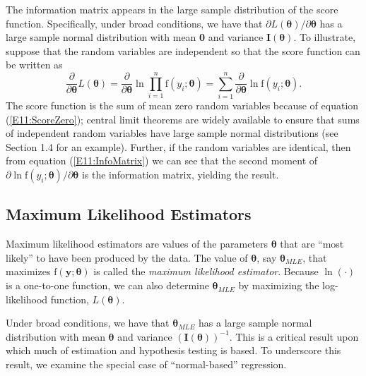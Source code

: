 The information matrix appears in the large sample distribution of
the score function. Specifically, under broad conditions, we have
that $\partial L(\boldsymbol \theta)/\partial \boldsymbol \theta$
has a large sample normal distribution with mean \textbf{0} and
variance $\mathbf{I}(\boldsymbol \theta)$. To illustrate, suppose
that the random variables are independent so that the score function
can be written as
\begin{equation*}
\frac{ \partial}{\partial \boldsymbol \theta} L(\boldsymbol \theta)
=\frac{ \partial}{\partial \boldsymbol \theta} \ln \prod_{i=1}^n
\mathrm{f}(y_i;\boldsymbol \theta ) =\sum_{i=1}^n \frac{
\partial}{\partial \boldsymbol \theta}
\ln \mathrm{f}(y_i;\boldsymbol \theta ).
\end{equation*}
The score function is the sum of mean zero random variables because
of equation (\ref{E11:ScoreZero}); central limit theorems are widely
available to ensure that sums of independent random variables have
large sample normal distributions (see Section 1.4 for an example).
Further, if the random variables are identical, then from equation
(\ref{E11:InfoMatrix}) we can see that the second moment of
$\partial \ln \mathrm{f}(y_i;\boldsymbol \theta ) /\partial
\boldsymbol \theta$ is the information matrix, yielding the result.

\subsection{Maximum Likelihood Estimators}\label{S11:MLEs}

Maximum likelihood estimators are values of the parameters
$\boldsymbol \theta$ that are ``most likely'' to have been produced
by the data. The value of $\boldsymbol \theta$, say $\boldsymbol
\theta_{MLE}$, that maximizes $\mathrm{f}(\mathbf{y};\boldsymbol
\theta)$ is called the\emph{ maximum likelihood estimator}. Because
$\ln(\cdot)$ is a one-to-one function, we can also determine
$\boldsymbol \theta_{MLE}$ by maximizing the log-likelihood
function, $L(\boldsymbol \theta)$.

Under broad conditions, we have that $\boldsymbol \theta_{MLE}$ has
a large sample normal distribution with mean $\boldsymbol \theta$
and variance $\left( \mathbf{I}(\boldsymbol \theta) \right)^{-1}$.
This is a critical result upon which much of estimation and
hypothesis testing is based. To underscore this result, we examine
the special case of ``normal-based'' regression.

